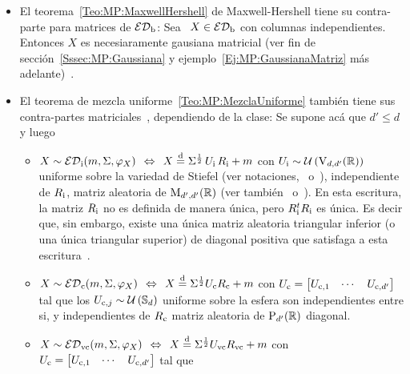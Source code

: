 \begin{itemize}
\item  El  teorema~\ref{Teo:MP:MaxwellHershell}  de  Maxwell-Hershell  tiene  su
  contra-parte para matrices de $\mathcal{ED}_{\mathrm{b}}$:  Sea \ $X \in \mathcal{ED}_{\mathrm{b}}$ con columnas
  independientes. Entonces $X$ es  necesiaramente gausiana matricial (ver fin de
  secci\'on~\ref{Sssec:MP:Gaussiana} y ejemplo~\ref{Ej:MP:GaussianaMatriz} m\'as
  adelante)~\cite[Teo.~8]{FanChe84}.
%
\item El teorema  de mezcla uniforme~\ref{Teo:MP:MezclaUniforme} tambi\'en tiene
  sus contra-partes  matriciales~\cite[Teo.~1 \& Lema.~9]{FanChe84}, dependiendo
  de la clase: Se supone ac\'a que $d' \le d$ y luego
  \begin{itemize}
  \item $X \sim \mathcal{ED}_{\mathrm{i}}(m,\Sigma,\varphi_X)  \:\: \Leftrightarrow \:\: X \stackrel{\mathrm{d}}{=}
    \Sigma^{\frac12}  \,  U_{\mathrm{i}} \,  R_{\mathrm{i}}  + m$  \:\:  con  \:\: $U_{\mathrm{i}}  \sim
    \mathcal{U}\left( \mathrm{V}_{d,d'}(\mathbb{R})  \right)$ uniforme sobre la  variedad de Stiefel
    (ver      notaciones,~\cite[p.~67-70]{Mui82}     o~\cite[\S~8.2]{GupNag99}),
    independiente  de $R_{\mathrm{i}}$, matriz  aleatoria de  $\mathrm{M}_{d',d'}(\mathbb{R})$ (ver
    tambi\'en~\cite[Lem.~1]{Kar81}   o~\cite[Teo.~9.7.3]{GupNag99}).    En  esta
    escritura,  la  matriz $R_{\mathrm{i}}$  no  es  definida  de manera  \'unica,  pero
    $R_{\mathrm{i}}^t R_{\mathrm{i}}$ es \'unica. Es  decir que, sin embargo, existe una \'unica
    matriz aleatoria triangular inferior  (o una \'unica triangular superior) de
    diagonal         positiva        que         satisfaga         a        esta
    escritura~\cite[Teo.~9.7.3]{GupNag99}.
  \item $X \sim \mathcal{ED}_{\mathrm{c}}(m,\Sigma,\varphi_X)  \:\: \Leftrightarrow \:\: X \stackrel{\mathrm{d}}{=}
    \Sigma^{\frac12} U_{\mathrm{c}} R_{\mathrm{c}} + m$  \:\: con \:\: $U_{\mathrm{c}} = \begin{bmatrix}
      U_{\mathrm{c},1} &  \cdots & U_{\mathrm{c},d'} \end{bmatrix}$ tal  que los $U_{\mathrm{c},j}
    \sim \mathcal{U}\left(  \mathbb{S}_d \right)$ uniforme sobre la  esfera son independientes
    entre   si,    y   independientes   de   $R_{\mathrm{c}}$    matriz   aleatoria   de
    $\mathrm{P}_{d'}(\mathbb{R})$ diagonal.
  \item $X \sim \mathcal{ED}_{\mathrm{vc}}(m,\Sigma,\varphi_X) \:\: \Leftrightarrow \:\: X \stackrel{\mathrm{d}}{=}
    \Sigma^{\frac12}   U_{\mathrm{vc}}   R_{\mathrm{vc}}   +    m$   \:\:   con   \:\:   $U_{\mathrm{c}}
    = \begin{bmatrix}  U_{\mathrm{c},1} & \cdots & U_{\mathrm{c},d'}  \end{bmatrix}$ tal que

\end{itemize}
\end{itemize}
